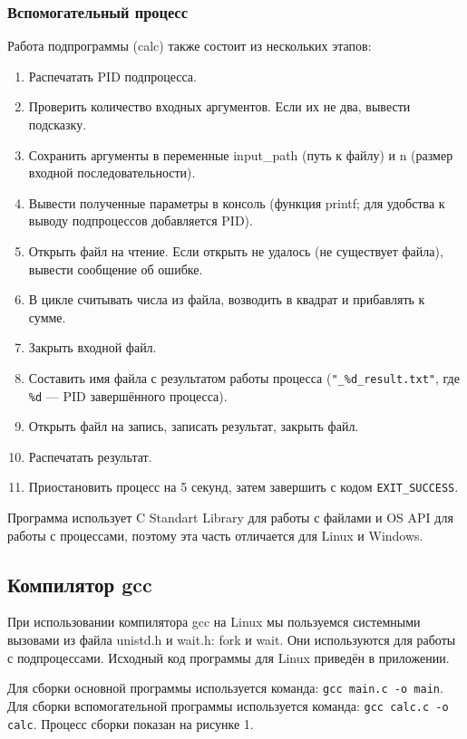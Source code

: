 \subsubsection{Вспомогательный процесс}

Работа подпрограммы (calc) также состоит из нескольких этапов:
\begin{enumerate}
    \item Распечатать PID подпроцесса.
    \item Проверить количество входных аргументов. Если их не два, вывести подсказку.
    \item Сохранить аргументы в переменные input\_path (путь к файлу) и n (размер входной последовательности).
    \item Вывести полученные параметры в консоль (функция printf; для удобства к выводу подпроцессов добавляется PID).
    \item Открыть файл на чтение. Если открыть не удалось (не существует файла), вывести сообщение об ошибке.
    \item В цикле считывать числа из файла, возводить в квадрат и прибавлять к сумме. 
    \item Закрыть входной файл.
    \item Составить имя файла с результатом работы процесса (\texttt{"\_\%d\_result.txt"}, где \texttt{\%d} — PID завершённого процесса).
    \item Открыть файл на запись, записать результат, закрыть файл.
    \item Распечатать результат.
    \item Приостановить процесс на 5 секунд, затем завершить с кодом \texttt{EXIT\_SUCCESS}.
\end{enumerate}


Программа использует C Standart Library для работы с файлами и OS API для работы с процессами, поэтому эта часть отличается для Linux и Windows.

\subsection{Компилятор gcc}

При использовании компилятора gcc на Linux мы пользуемся системными вызовами из файла unistd.h и wait.h: fork и wait. Они используются для работы с подпроцессами. Исходный код программы для Linux приведён в приложении.

Для сборки основной программы используется команда: \texttt{gcc main.c -o main}. Для сборки вспомогательной программы используется команда: \texttt{gcc calc.c -o calc}. Процесс сборки показан на рисунке 1.


